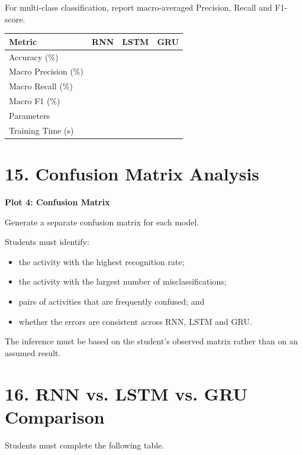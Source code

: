 \documentclass[10pt]{article}
\begin{document}
For multi-class classification, report macro-averaged Precision, Recall and
F1-score.

\begin{center}
\begin{tabular}{|l|c|c|c|}
\hline
Metric & RNN & LSTM & GRU\\
\hline
Accuracy (\%) & & &\\
Macro Precision (\%) & & &\\
Macro Recall (\%) & & &\\
Macro F1 (\%) & & &\\
Parameters & & &\\
Training Time (s) & & &\\
\hline
\end{tabular}
\end{center}

\section*{15. Confusion Matrix Analysis}

\textbf{Plot 4: Confusion Matrix}

Generate a separate confusion matrix for each model.

Students must identify:

\begin{itemize}
\item the activity with the highest recognition rate;
\item the activity with the largest number of misclassifications;
\item pairs of activities that are frequently confused; and
\item whether the errors are consistent across RNN, LSTM and GRU.
\end{itemize}

The inference must be based on the student's observed matrix rather than on
an assumed result.

\section*{16. RNN vs. LSTM vs. GRU Comparison}

Students must complete the following table.
\end{document}

